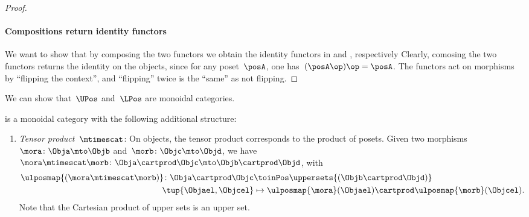 \begin{proof}
    \paragraph*{Compositions return identity functors}
    We want to show that by composing the two functors we obtain the identity functors in \UPos and \LPos, respectively
    Clearly, comosing the two functors returns the identity on the objects, since for any poset~$\posA$, one has~$(\posA\op)\op=\posA$.
    The functors act on morphisms by ``flipping the context'', and ``flipping'' twice is the ``same'' as not flipping.
\end{proof}

We can show that~$\UPos$ and~$\LPos$ are monoidal categories.

\begin{lemma}
    \label{lem:upos_moncat}
    \UPos is a monoidal category with the following additional structure:
    \begin{enumerate}
        \item \emph{Tensor product~$\mtimescat$}: On objects, the tensor product corresponds to the product of posets.
        Given two morphisms~$\mora\colon \Obja\mto \Objb$ and~$\morb\colon \Objc\mto \Objd$, we have~$\mora \mtimescat \morb\colon  \Obja \cartprod \Objc \mto \Objb\cartprod \Objd$, with
        \begin{equation}
            \begin{aligned}
                \ulposmap{(\mora\mtimescat \morb)}\colon \Obja \cartprod \Objc &\toinPos \uppersets{(\Objb\cartprod \Objd)}\\
                \tup{\Objael,\Objcel}&\mapsto \ulposmap{\mora}(\Objael)\cartprod \ulposmap{\morb}(\Objcel).
            \end{aligned}
        \end{equation}
        Note that the Cartesian product of upper sets is an upper set.
        

\end{enumerate}
\end{lemma}
